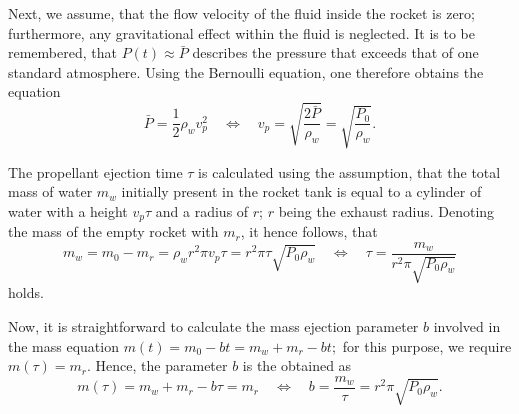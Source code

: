 \documentclass[a4paper,11pt]{report}
\begin{document}
Next, we assume, that the flow velocity of the fluid inside the rocket is zero; furthermore, any gravitational effect within the fluid is neglected. It is to be remembered, that $P(t) \approx \bar{P}$ describes the pressure that exceeds that of one standard atmosphere. Using the Bernoulli equation, one therefore obtains the equation \begin{equation}\label{eq:propellantejectionvelocity}
\bar{P} = \frac{1}{2}\rho_w v_p^2 \quad \Leftrightarrow \quad v_p = \sqrt{\frac{2\bar{P}}{\rho_w}} = \sqrt{\frac{P_0}{\rho_w}}.
\end{equation}

The propellant ejection time $\tau$ is calculated using the assumption, that the total mass of water $m_{w}$ initially present in the rocket tank is equal to a cylinder of water with a height $v_p\tau$ and a radius of $r$; $r$ being the exhaust radius. Denoting the mass of the empty rocket with $m_r$, it hence follows, that \begin{equation}\label{eq:propellantejectiontime}
m_{w} = m_0 - m_r = \rho_wr^2\pi v_p\tau = r^2 \pi \tau \sqrt{P_0\rho_w} \quad \Leftrightarrow \quad \tau = \frac{m_w}{r^2\pi \sqrt{P_0 \rho_w}}
\end{equation} holds.

Now, it is straightforward to calculate the mass ejection parameter $b$ involved in the mass equation $m(t) = m_0 - bt = m_w + m_r - bt;$ for this purpose, we require $m(\tau) = m_r$. Hence, the parameter $b$ is the obtained as \begin{equation}\label{eq:freeparameters}
m(\tau) = m_w + m_r -b\tau = m_r \quad \Leftrightarrow \quad b = \frac{m_w}{\tau} = r^2\pi \sqrt{P_0\rho_w}.
\end{equation}
\end{document}
